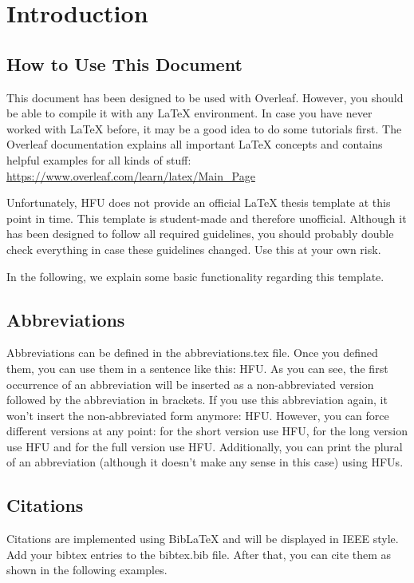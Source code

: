 \chapter{Introduction}

\section{How to Use This Document}
This document has been designed to be used with Overleaf. However, you should be able to compile it with any LaTeX environment. In case you have never worked with LaTeX before, it may be a good idea to do some tutorials first. The Overleaf documentation explains all important LaTeX concepts and contains helpful examples for all kinds of stuff: \url{https://www.overleaf.com/learn/latex/Main_Page}\par

Unfortunately, \acl{HFU} does not provide an official LaTeX thesis template at this point in time. This template is student-made and therefore unofficial. Although it has been designed to follow all required guidelines, you should probably double check everything in case these guidelines changed. Use this at your own risk.\par

In the following, we explain some basic functionality regarding this template.

\section{Abbreviations}
Abbreviations can be defined in the abbreviations.tex file. Once you defined them, you can use them in a sentence like this: \ac{HFU}. As you can see, the first occurrence of an abbreviation will be inserted as a non-abbreviated version followed by the abbreviation in brackets. If you use this abbreviation again, it won't insert the non-abbreviated form anymore: \ac{HFU}. However, you can force different versions at any point: for the short version use \acs{HFU}, for the long version use \acl{HFU} and for the full version use \acf{HFU}. Additionally, you can print the plural of an abbreviation (although it doesn't make any sense in this case) using \acsp{HFU}. 

\section{Citations}
Citations are implemented using BibLaTeX and will be displayed in IEEE style. Add your bibtex entries to the bibtex.bib file. After that, you can cite them as shown in the following examples.

